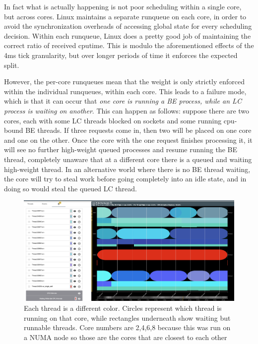 In fact what is actually happening is not poor scheduling within a single core,
but across cores. Linux maintains a separate runqueue on each core, in order to
avoid the synchronization overheads of accessing global state for every
scheduling decision. Within each runqueue, Linux does a pretty good job of
maintaining the correct ratio of received cputime. This is modulo the
aforementioned effects of the 4ms tick granularity, but over longer periods of
time it enforces the expected split.

However, the per-core runqueues mean that the weight is only strictly enforced
within the individual runqueues, \ie{} within each core. This leads to a failure
mode, which is that it can occur that \textit{one core is running a BE process,
while an LC process is waiting on another}. This can happen as follows: suppose
there are two cores, each with some LC threads blocked on sockets and some
running cpu-bound BE threads. If three requests come in, then two will be placed
on one core and one on the other. Once the core with the one request finishes
processing it, it will see no further high-weight queued processes and resume
running the BE thread, completely unaware that at a different core there is a
queued and waiting high-weight thread. In an alternative world where there is no
BE thread waiting, the core will try to steal work before going completely into
an idle state, and in doing so would steal the queued LC thread.

\begin{figure}[t]
    \centering
    \includegraphics[width=\textwidth]{graphs/schedviz.png}
        \caption{Each thread is a different color. Circles represent which
    thread is running on that core, while rectangles underneath show waiting but
    runnable threads. Core numbers are 2,4,6,8 because this was run on a NUMA
    node so those are the cores that are closest to each other
    }\label{fig:schedviz}
\end{figure}

